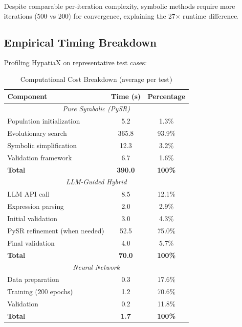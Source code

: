 \documentclass[11pt,a4paper]{article}
\begin{document}
Despite comparable per-iteration complexity, symbolic methods require more iterations (500 vs 200) for convergence, explaining the 27$\times$ runtime difference.

\subsection{Empirical Timing Breakdown}

Profiling HypatiaX on representative test cases:

\begin{table}[H]
\centering
\caption{Computational Cost Breakdown (average per test)}
\label{tab:timing_breakdown}
\begin{tabular}{@{}lcc@{}}
\toprule
\textbf{Component} & \textbf{Time (s)} & \textbf{Percentage} \\
\midrule
\multicolumn{3}{c}{\textit{Pure Symbolic (PySR)}} \\
\midrule
Population initialization & 5.2 & 1.3\% \\
Evolutionary search & 365.8 & 93.9\% \\
Symbolic simplification & 12.3 & 3.2\% \\
Validation framework & 6.7 & 1.6\% \\
\midrule
\textbf{Total} & \textbf{390.0} & \textbf{100\%} \\
\midrule
\multicolumn{3}{c}{\textit{LLM-Guided Hybrid}} \\
\midrule
LLM API call & 8.5 & 12.1\% \\
Expression parsing & 2.0 & 2.9\% \\
Initial validation & 3.0 & 4.3\% \\
PySR refinement (when needed) & 52.5 & 75.0\% \\
Final validation & 4.0 & 5.7\% \\
\midrule
\textbf{Total} & \textbf{70.0} & \textbf{100\%} \\
\midrule
\multicolumn{3}{c}{\textit{Neural Network}} \\
\midrule
Data preparation & 0.3 & 17.6\% \\
Training (200 epochs) & 1.2 & 70.6\% \\
Validation & 0.2 & 11.8\% \\
\midrule
\textbf{Total} & \textbf{1.7} & \textbf{100\%} \\
\bottomrule
\end{tabular}
\end{table}
\end{document}
